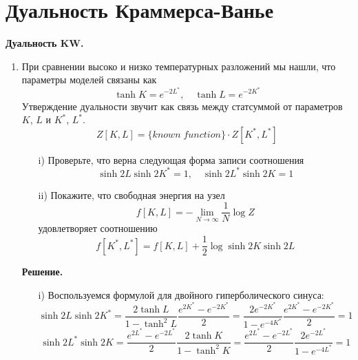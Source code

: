 \documentclass[12pt]{article}
\theoremstyle{definition}
\begin{document}
\section{Дуальность Краммерса-Ванье}
\textbf{Дуальность KW.}
\begin{enumerate}
    \item При сравнении высоко и низко температурных разложений мы нашли, что параметры моделей связаны как
    \begin{equation}
        \tanh K=e^{-2L^*},\quad \tanh L=e^{-2K^*}
    \end{equation}
    Утверждение дуальности звучит как связь между статсуммой от параметров $K$, $L$ и $K^*$, $L^*$.
    \begin{equation}
        Z[K,L]=\{known\; function\}\cdot Z[K^*,L^*]
    \end{equation}
    \begin{itemize}
        \item[i)] Проверьте, что верна следующая форма записи соотношения
        \begin{equation}
            \sinh2L\sinh2K^*=1,\quad\sinh2L^*\sinh2K=1
        \end{equation}
        \item[ii)] Покажите, что свободная энергия на узел
        \begin{equation}
            f[K,L]=-\lim\limits_{N\rightarrow\infty}\frac{1}{N}\log Z
        \end{equation}
        удовлетворяет соотношению
        \begin{equation}
            f[K^*,L^*]=f[K,L]+\frac{1}{2}\log\sinh2K\sinh2L
        \end{equation}
    \end{itemize}
    \textbf{Решение.}
    \begin{itemize}
        \item[i)] Воспользуемся формулой для двойного гиперболического синуса:
        \begin{equation}
            \sinh2L\sinh2K^*=\frac{2\tanh L}{1-\tanh^2L}\frac{e^{2K^*}-e^{-2K^*}}{2}=\frac{2e^{-2K^*}}{1-e^{-4K^*}}\frac{e^{2K^*}-e^{-2K^*}}{2}=1
        \end{equation}
        \begin{equation}
            \sinh2L^*\sinh2K=\frac{e^{2L^*}-e^{-2L^*}}{2}\frac{2\tanh K}{1-\tanh^2K}=\frac{e^{2L^*}-e^{-2L^*}}{2}\frac{2e^{-2L^*}}{1-e^{-4L^*}}=1
        \end{equation}
        \begin{equation}

\end{equation}
\end{itemize}
\end{enumerate}
\end{document}
